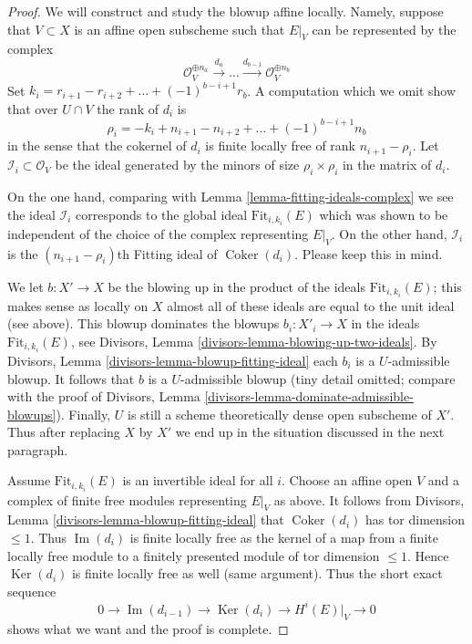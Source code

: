 \documentclass[10pt,a4paper]{amsart}
\theoremstyle{plain}
\theoremstyle{definition}
\theoremstyle{remark}
\numberwithin{equation}{subsection}
\def\Ker{\mathop{\mathrm{Ker}}}
\def\Im{\mathop{\mathrm{Im}}}
\def\Coker{\mathop{\mathrm{Coker}}}
\begin{document}
\begin{proof}
We will construct and study the blowup affine locally. Namely, suppose that
$V \subset X$ is an affine open subscheme such that
$E|_V$ can be represented by the complex
$$
\mathcal{O}_V^{\oplus n_a} \xrightarrow{d_a}
\ldots \xrightarrow{d_{b - 1}} \mathcal{O}_V^{\oplus n_b}
$$
Set $k_ i = r_{i + 1} - r_{i + 2} + \ldots + (-1)^{b - i + 1}r_b$.
A computation which we omit show that over $U \cap V$ the rank of
$d_i$ is
$$
\rho_i = - k_i + n_{i + 1} - n_{i + 2} + \ldots + (-1)^{b - i + 1}n_b
$$
in the sense that the cokernel of $d_i$ is finite locally
free of rank $n_{i + 1} - \rho_i$. Let
$\mathcal{I}_i \subset \mathcal{O}_V$ be the ideal generated by the minors
of size $\rho_i \times \rho_i$ in the matrix of $d_i$.

\medskip\noindent
On the one hand, comparing with Lemma \ref{lemma-fitting-ideals-complex}
we see the ideal $\mathcal{I}_i$ corresponds to the global ideal
$\text{Fit}_{i, k_i}(E)$ which was shown to be
independent of the choice of the complex representing $E|_V$.
On the other hand, $\mathcal{I}_i$ is the $(n_{i + 1} - \rho_i)$th
Fitting ideal of $\Coker(d_i)$. Please keep this in mind.

\medskip\noindent
We let $b : X' \to X$ be the blowing up in the product of the ideals
$\text{Fit}_{i, k_i}(E)$; this makes sense as locally on $X$
almost all of these ideals are equal to the unit ideal (see above).
This blowup dominates the blowups $b_i : X'_i \to X$ in
the ideals $\text{Fit}_{i, k_i}(E)$, see
Divisors, Lemma \ref{divisors-lemma-blowing-up-two-ideals}.
By Divisors, Lemma \ref{divisors-lemma-blowup-fitting-ideal}
each $b_i$ is a $U$-admissible blowup. It follows that
$b$ is a $U$-admissible blowup (tiny detail omitted; compare with
the proof of Divisors, Lemma \ref{divisors-lemma-dominate-admissible-blowups}).
Finally, $U$ is still a scheme theoretically dense open subscheme of $X'$.
Thus after replacing $X$ by $X'$ we end up in the situation
discussed in the next paragraph.

\medskip\noindent
Assume $\text{Fit}_{i, k_i}(E)$ is an invertible ideal for all $i$.
Choose an affine open $V$ and a complex of finite free modules
representing $E|_V$ as above. It follows from
Divisors, Lemma \ref{divisors-lemma-blowup-fitting-ideal}
that $\Coker(d_i)$ has tor dimension $\leq 1$. Thus
$\Im(d_i)$ is finite locally free as the kernel of a map
from a finite locally free module to a finitely presented
module of tor dimension $\leq 1$. Hence $\Ker(d_i)$
is finite locally free as well (same argument). Thus the short
exact sequence
$$
0 \to \Im(d_{i - 1}) \to \Ker(d_i) \to H^i(E)|_V \to 0
$$
shows what we want and the proof is complete.
\end{proof}
\end{document}
